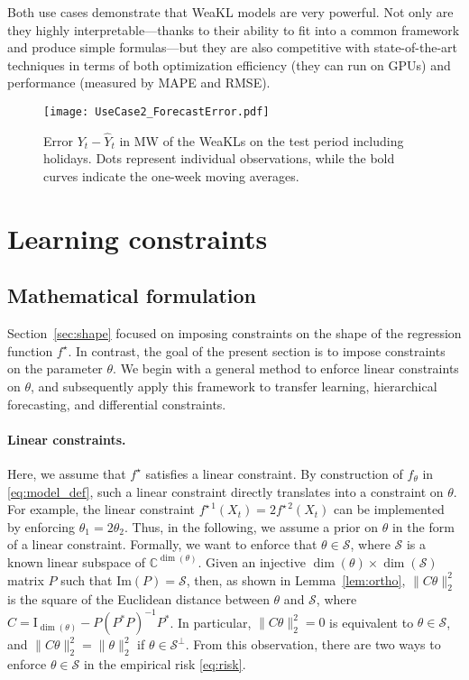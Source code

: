 Both use cases demonstrate that WeaKL models are very powerful. Not only are they highly interpretable---thanks to their ability to fit into a common framework and produce simple formulas---but they are also competitive with state-of-the-art techniques in terms of both optimization efficiency (they can run on GPUs) and performance (measured by MAPE and RMSE).
\begin{figure}
    \centering
    \texttt{[image: UseCase2\_ForecastError.pdf]}
    \caption{Error $Y_t - \hat Y_t$ in MW of the WeaKLs on the test period including holidays. Dots represent individual observations, while the bold curves indicate the one-week moving averages.}
    \label{fig:err_time_weaKL}
\end{figure}
\section{Learning constraints}
\label{sec:weight}
\subsection{Mathematical formulation}
Section~\ref{sec:shape} focused on imposing constraints on the shape of the regression function $f^\star$. In contrast, the goal of the present section is to impose constraints on the parameter $\theta$. 
We begin with a ge\-ne\-ral method to enforce linear constraints on $\theta$, and subsequently apply this framework to transfer learning, hierarchical forecasting, and differential constraints.

\paragraph{Linear constraints.}
Here, we assume that $f^\star$ satisfies a linear constraint.
By construction of $f_\theta$ in \eqref{eq:model_def}, such a linear constraint directly translates into a constraint on $\theta$.
For example, the linear constraint $f^{\star\,1}(X_t) = 2f^{\star\,2}(X_t)$ can be implemented by enforcing $\theta_1 = 2\theta_2$.
Thus, in the following, we assume a prior on $\theta$ in the form of a linear constraint. Formally, we want to enforce that $\theta \in \mathcal{S}$, where $\mathcal{S}$ is a known linear subspace of $\mathbb{C}^{\dim(\theta)}$.
Given an injective $\dim(\theta) \times \dim(\mathcal{S})$ matrix $P$ such that $\mathrm{Im}(P) = \mathcal{S}$, then, as shown in Lemma~\ref{lem:ortho}, $\|C\theta\|_2^2$ is the square of the Euclidean distance between $\theta$ and $\mathcal S$, where $C=\mathrm{I}_{\dim(\theta)} - P(P^\ast P)^{-1}P^\ast$.  In particular, $\|C\theta\|_2^2 = 0 $ is equivalent to $\theta \in \mathcal S$, and $\|C\theta\|_2^2 = \|\theta\|_2^2$ if $\theta \in \mathcal S^\perp$. From this observation, there are two ways to enforce $\theta \in \mathcal S$ in the empirical risk \eqref{eq:risk}.

